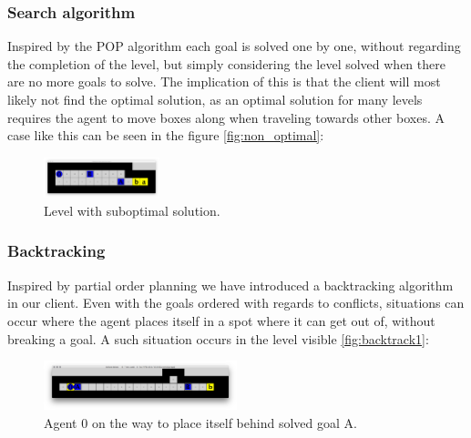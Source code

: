 \documentclass[Main]{subfiles}
\begin{document}
\subsubsection{Search algorithm}
Inspired by the POP algorithm each goal is solved one by one, without regarding the completion of the level, but simply considering the level solved when there are no more goals to solve. The implication of this is that the client will most likely not find the optimal solution, as an optimal solution for many levels requires the agent to move boxes along when traveling towards other boxes. A case like this can be seen in the figure \autoref{fig:non_optimal}:
\begin{figure}[h!]
    \centering
    \includegraphics[width=0.3\textwidth]{non_optimal.png}
    \caption{Level with suboptimal solution.}
    \label{fig:non_optimal}
\end{figure}




\subsubsection{Backtracking}

Inspired by partial order planning we have introduced a backtracking algorithm in our client. Even with the goals ordered with regards to conflicts, situations can occur where the agent places itself in a spot where it can get out of, without breaking a goal. A such situation occurs in the level visible \autoref{fig:backtrack1}:
\begin{figure}[h!]
    \centering
    \includegraphics[width=0.5\textwidth]{backtrack1.png}
    \caption{Agent 0 on the way to place itself behind solved goal A.}
    \label{fig:backtrack1}
\end{figure}
\end{document}
